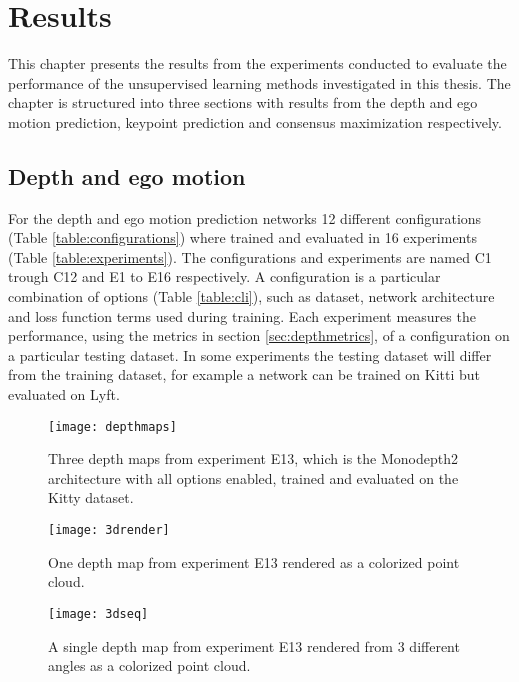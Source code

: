 \chapter{Results}\label{cha:results}

This chapter presents the results from the experiments conducted to evaluate the performance of the unsupervised learning methods investigated in this thesis. The chapter is structured into three sections with results from the depth and ego motion prediction, keypoint prediction and consensus maximization respectively.

\section{Depth and ego motion}

For the depth and ego motion prediction networks 12 different configurations (Table \ref{table:configurations}) where trained and evaluated in 16 experiments (Table \ref{table:experiments}). The configurations and experiments are named C1 trough C12 and E1 to E16 respectively. A configuration is a particular combination of options (Table \ref{table:cli}), such as dataset, network architecture and loss function terms used during training. Each experiment measures the performance, using the metrics in section \ref{sec:depthmetrics}, of a configuration on a particular testing dataset. In some experiments the testing dataset will differ from the training dataset, for example a network can be trained on Kitti but evaluated on Lyft.

\begin{figure}[H]
	\centering
	\texttt{[image: depthmaps]}
	\caption{Three depth maps from experiment E13, which is the Monodepth2 architecture with all options enabled, trained and evaluated on the Kitty dataset.}
	\label{fig:depthmapskitty}
\end{figure}

\begin{figure}[H]
	\centering
	\texttt{[image: 3drender]}
	\caption{One depth map from experiment E13 rendered as a colorized point cloud.}
	\label{fig:3drender}
\end{figure}

\begin{figure}[H]
	\centering
	\texttt{[image: 3dseq]}
	\caption{A single depth map from experiment E13 rendered from 3 different angles as a colorized point cloud.}
	\label{fig:3dseq}
\end{figure}

